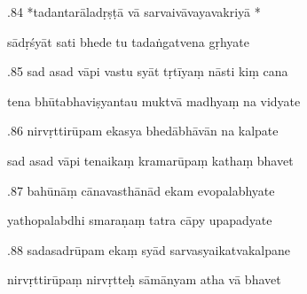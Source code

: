 \documentclass[article,12pt,a4paper]{memoir}%
\newcounter{parCount}
\begin{document}
	  
	  \pstart {}.84 *tadantarāladṛṣṭā vā sarvaivāvayavakriyā *
	{}
	\pend%
      

	  
	  \pstart \leavevmode%
	sādṛśyāt sati bhede tu tadaṅgatvena gṛhyate 
	{}
	\pend%
      

	  
	  \pstart {}.85 sad asad vāpi vastu syāt tṛtīyaṃ nāsti kiṃ cana 
	{}
	\pend%
      

	  
	  \pstart \leavevmode%
	tena bhūtabhaviṣyantau muktvā madhyaṃ na vidyate 
	{}
	\pend%
      

	  
	  \pstart {}.86 nirvṛttirūpam ekasya bhedābhāvān na kalpate 
	{}
	\pend%
      

	  
	  \pstart \leavevmode%
	sad asad vāpi tenaikaṃ kramarūpaṃ kathaṃ bhavet 
	{}
	\pend%
      

	  
	  \pstart {}.87 bahūnāṃ cānavasthānād ekam evopalabhyate 
	{}
	\pend%
      

	  
	  \pstart \leavevmode%
	yathopalabdhi smaraṇaṃ tatra cāpy upapadyate 
	{}
	\pend%
      

	  
	  \pstart {}.88 sadasadrūpam ekaṃ syād sarvasyaikatvakalpane 
	{}
	\pend%
      

	  
	  \pstart \leavevmode%
	nirvṛttirūpaṃ nirvṛtteḥ sāmānyam atha vā bhavet 
	{}
	\pend%
      
\end{document}
